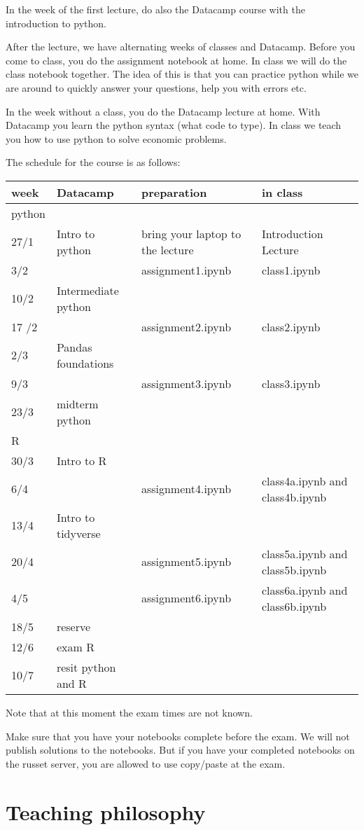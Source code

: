 \documentclass[]{book}
\begin{document}
In the week of the first lecture, do also the Datacamp course with the introduction to python.

After the lecture, we have alternating weeks of classes and Datacamp. Before you come to class, you do the assignment notebook at home. In class we will do the class notebook together. The idea of this is that you can practice python while we are around to quickly answer your questions, help you with errors etc.

In the week without a class, you do the Datacamp lecture at home. With Datacamp you learn the python syntax (what code to type). In class we teach you how to use python to solve economic problems.

The schedule for the course is as follows:

\begin{longtable}[]{@{}llll@{}}
\toprule
week & Datacamp & preparation & in class\tabularnewline
\midrule
\endhead
python & & &\tabularnewline
27/1 & Intro to python & bring your laptop to the lecture & Introduction Lecture\tabularnewline
3/2 & & assignment1.ipynb & class1.ipynb\tabularnewline
10/2 & Intermediate python & &\tabularnewline
17 /2 & & assignment2.ipynb & class2.ipynb\tabularnewline
2/3 & Pandas foundations & &\tabularnewline
9/3 & & assignment3.ipynb & class3.ipynb\tabularnewline
23/3 & midterm python & &\tabularnewline
R & & &\tabularnewline
30/3 & Intro to R & &\tabularnewline
6/4 & & assignment4.ipynb & class4a.ipynb and class4b.ipynb\tabularnewline
13/4 & Intro to tidyverse & &\tabularnewline
20/4 & & assignment5.ipynb & class5a.ipynb and class5b.ipynb\tabularnewline
4/5 & & assignment6.ipynb & class6a.ipynb and class6b.ipynb\tabularnewline
18/5 & reserve & &\tabularnewline
12/6 & exam R & &\tabularnewline
10/7 & resit python and R & &\tabularnewline
\bottomrule
\end{longtable}

Note that at this moment the exam times are not known.

Make sure that you have your notebooks complete before the exam. We will not publish solutions to the notebooks. But if you have your completed notebooks on the russet server, you are allowed to use copy/paste at the exam.

\hypertarget{teaching-philosophy}{%
\section{Teaching philosophy}\label{teaching-philosophy}}
\end{document}
